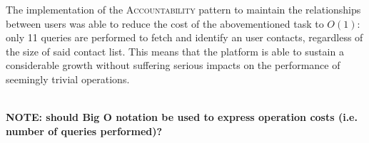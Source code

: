 The implementation of the \textsc{Accountability} pattern to maintain the relationships between users was able to reduce the cost of the abovementioned task to $O(1)$: only 11 queries are performed to fetch and identify an user contacts, regardless of the size of said contact list. This means that the platform is able to sustain a considerable growth without suffering serious impacts on the performance of seemingly trivial operations.

\ \\
\textbf{NOTE: should Big O notation be used to express operation costs (i.e. number of queries performed)?}







